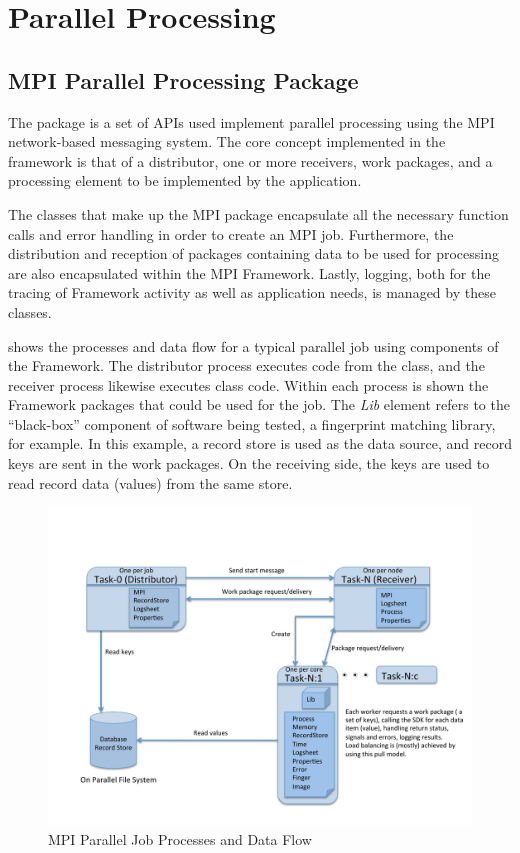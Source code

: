 %
%
\chapter{Parallel Processing}
\label{chp-parallel}

\section{MPI Parallel Processing Package}
The  package is a set of APIs used implement parallel processing
using the MPI~\cite{mpi} network-based messaging system. The core concept
implemented in the framework is that of a distributor, one or more receivers,
work packages, and a processing element to be implemented by the application.

The classes that make up the MPI package encapsulate all the necessary function
calls and error handling in order to create an MPI job. Furthermore, the
distribution and reception of packages containing data to be used for processing
are also encapsulated within the MPI Framework. Lastly, logging, both for the
tracing of Framework activity as well as application needs, is managed by
these classes.

 shows the processes and data flow for a typical 
parallel job using components of the Framework. The distributor process
executes code from the  class, and the receiver process
likewise executes  class code. Within each process is shown
the Framework packages that could be used for the job. The {\em Lib} element
refers to the ``black-box'' component of software being tested, a fingerprint
matching library, for example. In this example, a record store is used as the
data source, and record keys are sent in the work packages. On the receiving
side, the keys are used to read record data (values) from the same store.

\begin{figure}
	\centering
	\includegraphics[width=\textwidth]{ParallelJob}
	\caption{MPI Parallel Job Processes and Data Flow}
	\label{fig:paralleljob}
\end{figure}

